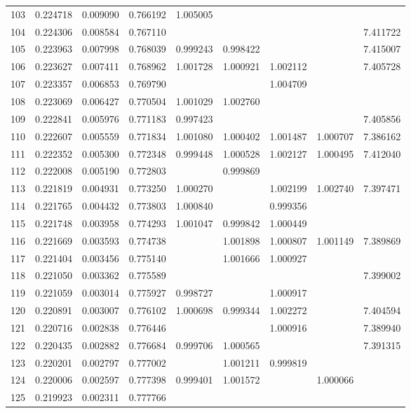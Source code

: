 \documentclass{elsarticle}
\begin{document}
\begin{center}
\begin{longtable}{|c|ccc|cccc|c|}
  103 & 0.224718 & 0.009090 & 0.766192 & 1.005005 &  &  &  &  \\
  104 & 0.224306 & 0.008584 & 0.767110 &  &  &  &  & 7.411722 \\
  105 & 0.223963 & 0.007998 & 0.768039 & 0.999243 & 0.998422 &  &  & 7.415007 \\
  106 & 0.223627 & 0.007411 & 0.768962 & 1.001728 & 1.000921 & 1.002112 &  & 7.405728 \\
  107 & 0.223357 & 0.006853 & 0.769790 &  &  & 1.004709 &  &  \\
  108 & 0.223069 & 0.006427 & 0.770504 & 1.001029 & 1.002760 &  &  &  \\
  109 & 0.222841 & 0.005976 & 0.771183 & 0.997423 &  &  &  & 7.405856 \\
  110 & 0.222607 & 0.005559 & 0.771834 & 1.001080 & 1.000402 & 1.001487 & 1.000707 & 7.386162 \\
  111 & 0.222352 & 0.005300 & 0.772348 & 0.999448 & 1.000528 & 1.002127 & 1.000495 & 7.412040 \\
  112 & 0.222008 & 0.005190 & 0.772803 &  & 0.999869 &  &  &  \\
  113 & 0.221819 & 0.004931 & 0.773250 & 1.000270 &  & 1.002199 & 1.002740 & 7.397471 \\
  114 & 0.221765 & 0.004432 & 0.773803 & 1.000840 &  & 0.999356 &  &  \\
  115 & 0.221748 & 0.003958 & 0.774293 & 1.001047 & 0.999842 & 1.000449 &  &  \\
  116 & 0.221669 & 0.003593 & 0.774738 &  & 1.001898 & 1.000807 & 1.001149 & 7.389869 \\
  117 & 0.221404 & 0.003456 & 0.775140 &  & 1.001666 & 1.000927 &  &  \\
  118 & 0.221050 & 0.003362 & 0.775589 &  &  &  &  & 7.399002 \\
  119 & 0.221059 & 0.003014 & 0.775927 & 0.998727 &  & 1.000917 &  &  \\
  120 & 0.220891 & 0.003007 & 0.776102 & 1.000698 & 0.999344 & 1.002272 &  & 7.404594 \\
  121 & 0.220716 & 0.002838 & 0.776446 &  &  & 1.000916 &  & 7.389940 \\
  122 & 0.220435 & 0.002882 & 0.776684 & 0.999706 & 1.000565 &  &  & 7.391315 \\
  123 & 0.220201 & 0.002797 & 0.777002 &  & 1.001211 & 0.999819 &  &  \\
  124 & 0.220006 & 0.002597 & 0.777398 & 0.999401 & 1.001572 &  & 1.000066 &  \\
  125 & 0.219923 & 0.002311 & 0.777766 &  &  &  &  & 
\label{tab:data}
\end{longtable}
\end{center}
\end{document}
